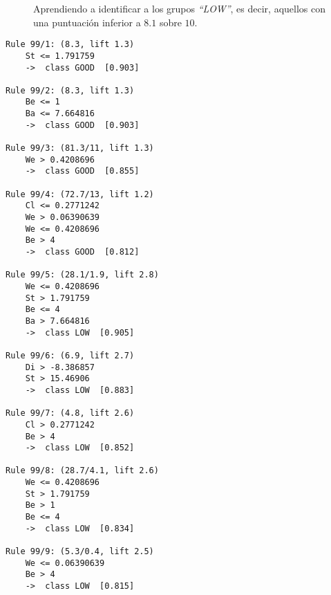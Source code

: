 \begin{figure}[H]
\centering
{}
\caption{Aprendiendo a identificar a los grupos \emph{``LOW''}, es decir, aquellos con una puntuación inferior a $8.1$ sobre $10$.}
\label{fig:cm3}
\end{figure}

\begin{tcolorbox}[title=Reglas de clasificación para identificar grupos de tipo \emph{``LOW''}.]
  \makeatletter
  \makeatother
\begin{multicols}{2}
    \begin{verbatim}
Rule 99/1: (8.3, lift 1.3)
	St <= 1.791759
	->  class GOOD  [0.903]

Rule 99/2: (8.3, lift 1.3)
	Be <= 1
	Ba <= 7.664816
	->  class GOOD  [0.903]

Rule 99/3: (81.3/11, lift 1.3)
	We > 0.4208696
	->  class GOOD  [0.855]

Rule 99/4: (72.7/13, lift 1.2)
	Cl <= 0.2771242
	We > 0.06390639
	We <= 0.4208696
	Be > 4
	->  class GOOD  [0.812]

Rule 99/5: (28.1/1.9, lift 2.8)
	We <= 0.4208696
	St > 1.791759
	Be <= 4
	Ba > 7.664816
	->  class LOW  [0.905]

Rule 99/6: (6.9, lift 2.7)
	Di > -8.386857
	St > 15.46906
	->  class LOW  [0.883]

Rule 99/7: (4.8, lift 2.6)
	Cl > 0.2771242
	Be > 4
	->  class LOW  [0.852]

Rule 99/8: (28.7/4.1, lift 2.6)
	We <= 0.4208696
	St > 1.791759
	Be > 1
	Be <= 4
	->  class LOW  [0.834]

Rule 99/9: (5.3/0.4, lift 2.5)
	We <= 0.06390639
	Be > 4
	->  class LOW  [0.815]
    \end{verbatim}
  \end{multicols}
\label{rules3}
\end{tcolorbox}

